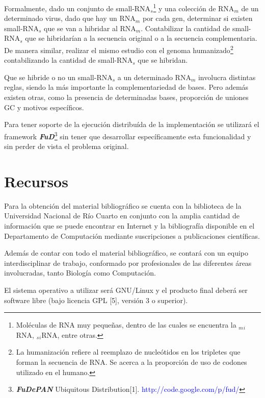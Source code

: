 \documentclass[12pt,a4paper]{article}
\begin{document}
\par Formalmente, dado un conjunto de small-RNA$_s$\footnote{Moléculas de RNA muy pequeñas, dentro de las cuales se encuentra la $_m$$_i$RNA, $_s$$_i$RNA, entre otras.} y una colección de RNA$_m$ de un determinado virus, dado que hay un RNA$_m$ por cada gen, determinar si existen small-RNA$_s$ que se van a hibridar al RNA$_m$. Contabilizar la cantidad de small-RNA$_s$ que se hibridarían a la secuencia original o a la secuencia complementaria. De manera similar, realizar el mismo estudio con el genoma humanizado\footnote{La humanización refiere al reemplazo de nucleótidos en los tripletes que forman la secuencia de RNA. Se acerca a la proporción de uso de codones utilizado en el humano.} contabilizando la cantidad de small-RNA$_s$ que se hibridan. 
\par Que se hibride o no un small-RNA$_s$ a un determinado RNA$_m$ involucra distintas reglas, siendo la más importante la complementariedad de bases. Pero además existen otras, como la presencia de determinadas bases, proporción de uniones GC y motivos específicos.

\par Para tener soporte de la ejecución distribuída de la implementación se utilizará el framework \textbf{\textit{FuD}}\footnote{\textbf{\textit{FuDePAN}} Ubiquitous Distribution[1]. \textcolor{blue}{http://code.google.com/p/fud/}} sin tener que desarrollar específicamente esta funcionalidad y sin perder de vista el problema original.

\section{Recursos}

\par Para la obtención del material bibliográfico se cuenta con la biblioteca de la Universidad Nacional de Río Cuarto en conjunto con la amplia cantidad de información que se puede encontrar en Internet y la bibliografía disponible en el Departamento de Computación mediante suscripciones a publicaciones científicas.

\par Además de contar con todo el material bibliográfico, se contará con un equipo interdisciplinar de trabajo, conformado por profesionales de las diferentes áreas involucradas, tanto Biología como Computación. 

\par El sistema operativo a utilizar será GNU/Linux y el producto final deberá ser software libre (bajo licencia GPL [5], versión 3 o superior).
\end{document}
